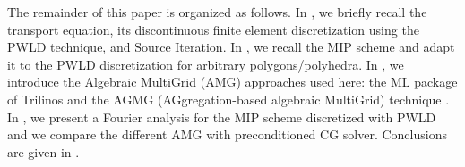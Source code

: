 The remainder of this paper is organized as follows. In ,
we briefly recall the \sn transport equation, its discontinuous finite element
discretization using the PWLD technique, and Source Iteration. In , 
we recall the MIP scheme and adapt it to the PWLD discretization for arbitrary 
polygons/polyhedra. In , we introduce the Algebraic MultiGrid (AMG) 
approaches used here: the ML package of Trilinos \cite{ml_guide} and the
AGMG (AGgregation-based algebraic MultiGrid) technique \cite{agmg_guide}. In
, we present a Fourier analysis for the MIP scheme discretized with
PWLD and we compare the different AMG with preconditioned CG solver.
Conclusions are given in .
